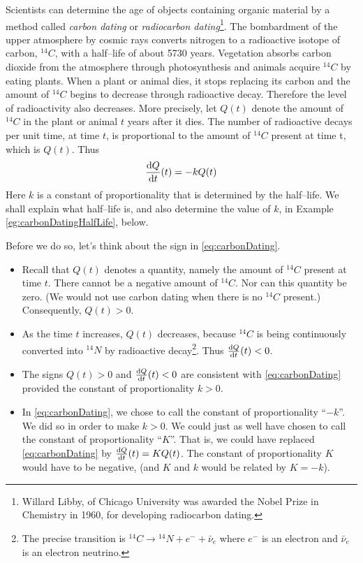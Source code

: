 Scientists can determine the age of objects containing organic
material by a method called \emph{carbon dating} or
\emph{radiocarbon dating}\footnote{Willard Libby, of Chicago
University was awarded the Nobel Prize in Chemistry in 1960, for
developing radiocarbon dating.}. The bombardment of the upper atmosphere
by cosmic rays converts nitrogen to a radioactive isotope of carbon,
${}^{14}C$, with a half--life of about 5730 years. Vegetation
absorbs carbon dioxide from the atmosphere through photosynthesis
and animals acquire ${}^{14}C$ by eating plants.  When a plant or animal
dies, it stops replacing its carbon and the amount of
${}^{14}C$ begins to decrease through radioactive decay.
Therefore the level of radioactivity also decreases. More precisely,
let $Q(t)$ denote the amount of ${}^{14}C$ in the plant or animal $t$
years after it dies. The number of radioactive decays per unit time,
at time $t$, is proportional to the amount of ${}^{14}C$ present
at time t, which is $Q(t)$. Thus
\begin{equation}\label{eq:carbonDating}
\diff{Q}{t}(t)=-k Q(t)
\end{equation}
Here $k$ is a constant of proportionality that is determined by the
half--life. We shall explain what half--life is, and also determine the
value of $k$, in Example \ref{eg:carbonDatingHalfLife}, below.

Before we do so, let's think about the sign in \eqref{eq:carbonDating}.
\begin{itemize}
\item
Recall that $Q(t)$ denotes a quantity, namely the amount
of ${}^{14}C$ present at time $t$.
There cannot be a negative amount of ${}^{14}C$.
Nor can this quantity be zero. (We would not use carbon dating
when there is no ${}^{14}C$ present.)
Consequently, $Q(t)> 0$.
\item
As the time $t$ increases,
$Q(t)$ decreases, because ${}^{14}C$ is being continuously
converted into ${}^{14}N$ by radioactive decay\footnote{
The precise transition is ${}^{14}C\rightarrow {}^{14}N+ e^- + \bar{\nu}_e$
where $e^-$ is an electron and $\bar{\nu}_e $ is an electron neutrino.}.
Thus $\diff{Q}{t}(t)< 0$.
\item
The signs $Q(t)> 0$ and $\diff{Q}{t}(t)< 0$
are consistent with \eqref{eq:carbonDating} provided the constant of
proportionality $k>0$.
\item
In \eqref{eq:carbonDating}, we chose to call
the constant of proportionality ``$-k$''. We did so in order to make $k>0$.
We could just as well have chosen to call
the constant of proportionality ``$K$''.  That is, we could have replaced
\eqref{eq:carbonDating} by $\diff{Q}{t}(t)=K Q(t)$. The constant of
proportionality $K$ would have to be negative, (and $K$ and $k$ would be
related by  $K=-k$).
\end{itemize}

